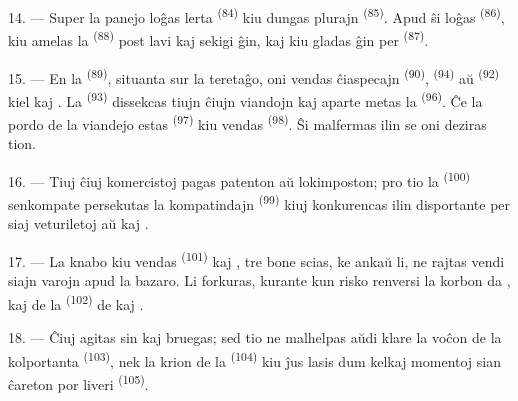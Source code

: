 14. --- Super la panejo loĝas lerta  \textsuperscript{(84)}
kiu dungas plurajn  \textsuperscript{(85)}. Apud ŝi loĝas
 \textsuperscript{(86)}, kiu amelas la 
\textsuperscript{(88)} post lavi kaj sekigi ĝin, kaj kiu gladas ĝin per
 \textsuperscript{(87)}.

\VUsaut{4.0mm}
\VUsaut{3.0mm}

15. --- En la  \textsuperscript{(89)}, situanta sur la
teretaĝo, oni vendas ĉiaspecajn 
\textsuperscript{(90)},  \textsuperscript{(94)} aŭ
 \textsuperscript{(92)} kiel  kaj . La 
\textsuperscript{(93)} dissekcas tiujn ĉiujn viandojn kaj aparte metas la
 \textsuperscript{(96)}. Ĉe la pordo de la viandejo estas
 \textsuperscript{(97)} kiu vendas 
\textsuperscript{(98)}. Ŝi malfermas ilin se oni deziras tion.

16. --- Tiuj ĉiuj komercistoj pagas patenton aŭ lokimposton; pro tio la
 \textsuperscript{(100)} senkompate persekutas la kompatindajn
 \textsuperscript{(99)} kiuj konkurencas ilin
disportante per siaj veturiletoj  aŭ  kaj .

\VUsaut{4.0mm}
\VUsaut{3.0mm}

17. --- La knabo kiu vendas  \textsuperscript{(101)} kaj
, tre bone scias, ke ankaŭ li, ne rajtas vendi siajn varojn apud
la bazaro. Li forkuras, kurante kun risko renversi la korbon da ,
 kaj  de la 
\textsuperscript{(102)} de  kaj .

18. --- Ĉiuj agitas sin kaj bruegas; sed tio ne malhelpas aŭdi klare la voĉon de
la kolportanta  \textsuperscript{(103)}, nek la krion de la
 \textsuperscript{(104)} kiu ĵus lasis dum kelkaj momentoj
sian ĉareton por liveri  \textsuperscript{(105)}.
\VUsaut{6.0mm}
\VUfilet{22mm}
